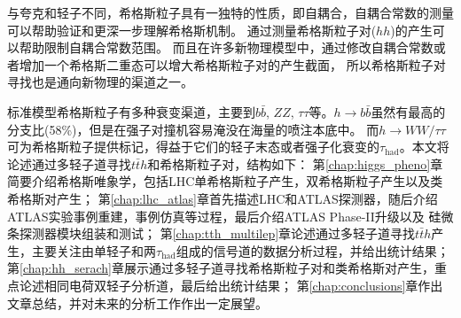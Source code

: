 与夸克和轻子不同，希格斯粒子具有一独特的性质，即自耦合，自耦合常数的测量可以帮助验证和更深一步理解希格斯机制。
通过测量希格斯粒子对($hh$)的产生可以帮助限制自耦合常数范围。
而且在许多新物理模型中，通过修改自耦合常数或者增加一个希格斯二重态可以增大希格斯粒子对的产生截面，
所以希格斯粒子对寻找也是通向新物理的渠道之一。

标准模型希格斯粒子有多种衰变渠道，主要到$b\bar{b}$, $ZZ$, $\tau\tau$等。$h\rightarrow b\bar{b}$虽然有最高的分支比(58\%)，但是在强子对撞机容易淹没在海量的喷注本底中。
而$h\rightarrow WW/\tau\tau$可为希格斯粒子提供标记，得益于它们的轻子末态或者强子化衰变的$\tau_{\text{had}}$。本文将论述通过多轻子道寻找$t\bar{t}h$和希格斯粒子对，结构如下：
第\ref{chap:higgs_pheno}章简要介绍希格斯唯象学，包括LHC单希格斯粒子产生，双希格斯粒子产生以及类希格斯对产生；
第\ref{chap:lhc_atlas}章首先描述LHC和ATLAS探测器，随后介绍ATLAS实验事例重建，事例仿真等过程，最后介绍ATLAS Phase-II升级以及
硅微条探测器模块组装和测试；
第\ref{chap:tth_multilep}章论述通过多轻子道寻找$t\bar{t}h$产生，主要关注由单轻子和两$\tau_{\text{had}}$组成的信号道的数据分析过程，并给出统计结果；
第\ref{chap:hh_serach}章展示通过多轻子道寻找希格斯粒子对和类希格斯对产生，重点论述相同电荷双轻子分析道，最后给出统计结果；
第\ref{chap:conclusions}章作出文章总结，并对未来的分析工作作出一定展望。
